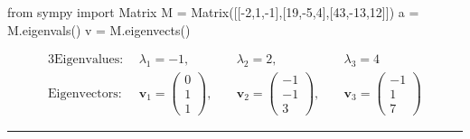 \documentclass[11pt]{article}
\begin{document}
\begin{preview}
\begin{enumerate}
            \begin{python}
                  from sympy import Matrix
                  M = Matrix([[-2,1,-1],[19,-5,4],[43,-13,12]])
                  a = M.eigenvals()
                  v = M.eigenvects()
            \end{python}
            \begin{alignat*}{3}
                  \mathrm{Eigenvalues:} \; &\lambda_1 = -1, \; &&\lambda_2 = 2, \; &&\lambda_3 = 4 \\
                  \mathrm{Eigenvectors:} \; &\textbf{v}_1 = \begin{pmatrix}0\\1\\1\end{pmatrix}, \; &&\textbf{v}_2= \begin{pmatrix}-1\\-1\\3\end{pmatrix}, \; &&\textbf{v}_3= \begin{pmatrix}-1\\1\\7\end{pmatrix}
            \end{alignat*}
      \end{enumerate}
      \hrule
\end{preview}
\end{document}
